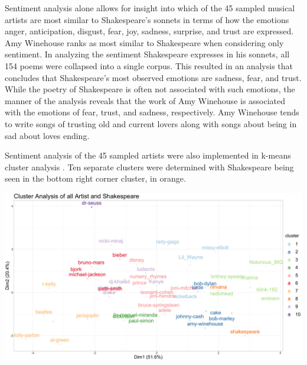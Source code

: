 \documentclass[10pt,a4paper]{article}
\begin{document}


\noindent Sentiment analysis alone allows for insight into which of the 45 sampled musical artists are most similar to Shakespeare’s sonnets in terms of how the emotions anger, anticipation, disgust, fear, joy, sadness, surprise, and trust are expressed. Amy Winehouse ranks as most similar to Shakespeare when considering only sentiment. In analyzing the sentiment Shakespeare expresses in his sonnets, all 154 poems were collapsed into a single corpus. This resulted in an analysis that concludes that Shakespeare’s most observed emotions are sadness, fear, and trust. While the poetry of Shakespeare is often not associated with such emotions, the manner of the analysis reveals that the work of Amy Winehouse is associated with the emotions of fear, trust, and sadness, respectively. Amy Winehouse tends to write songs of trusting old and current lovers along with songs about being in sad about loves ending. 

  

\noindent Sentiment analysis of the 45 sampled artists were also implemented in k-means cluster analysis . Ten separate clusters were determined with Shakespeare being seen in the bottom right corner cluster, in orange. 

\begin{center}
\includegraphics[width=14cm]{_assets/ClusterAnalysis_Fit10.png}
\end{center}

\end{document}
